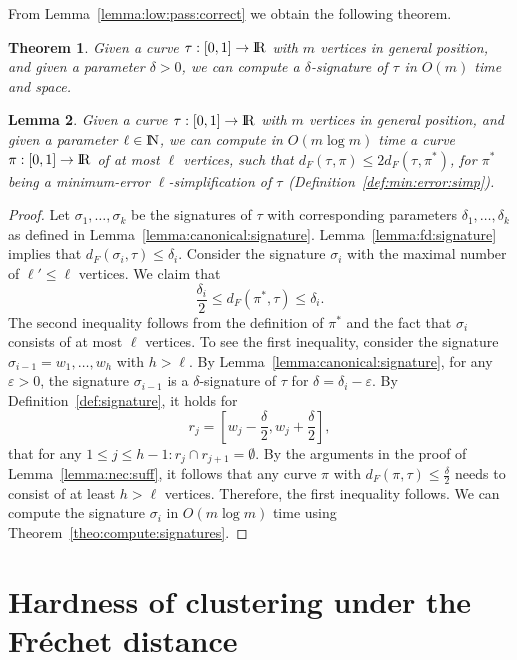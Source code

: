 \documentclass[11pt, letter]{article}
\newtheorem{theorem}{Theorem}[section]
\newtheorem{lemma}[theorem]{Lemma}
\newcommand{\seclab}[1]{\label{sec:#1}}
\newcommand{\thmlab}[1]{{\label{theo:#1}}}
\newcommand{\thmref}[1]{Theorem~\ref{theo:#1}}
\newcommand{\lemlab}[1]{\label{lemma:#1}}
\newcommand{\lemref}[1]{Lemma~\ref{lemma:#1}}
\newcommand{\defref}[1]{Definition~\ref{def:#1}}
\newcommand{\Frechet}{Fr\'echet\xspace}
\providecommand{\eps}{{\varepsilon}}\newcommand{\Astop}{\overline{a}}
\providecommand{\pth}[2][\!]{#1\left({#2}\right)}
\renewcommand{\Re}{{\rm I\!\hspace{-0.025em} R}}
\newcommand{\Na}{{\rm I\!\hspace{-0.025em} N}}
\newcommand{\trajectory}[2]{\ensuremath{{#1}_{#2}}}
\newcommand{\inputSym}{\ensuremath{\tau}}
\newcommand{\inputTraj}[1]{\trajectory{\inputSym}{#1}}
\newcommand{\distFr}[2]{\ensuremath{d_F\pth{#1,#2}}}
\begin{document}
From \lemref{low:pass:correct} we obtain the following theorem.

\begin{theorem}\thmlab{computing:delta:signature}
Given a curve $\tau:[0,1]\rightarrow\Re$ with $m$ vertices 
in general position, and given a parameter $\delta>0$, we can compute a $\delta$-signature of $\inputTraj{}$ in $O(m)$ time and space.
\end{theorem}



\begin{lemma}\lemlab{apx:min:error:simp}
Given a curve $\tau:[0,1]\rightarrow\Re$ with $m$ vertices 
in general position, and given a parameter $\ell \in \Na$, we can compute in $O(m \log m)$ time a curve $\pi:[0,1]\rightarrow\Re$ of at most $\ell$ vertices, such that $\distFr{\inputTraj{}}{\pi} \leq 2 \distFr{\inputTraj{}}{\pi^*}$, for $\pi^*$ being a minimum-error $\ell$-simplification of $\inputTraj{}$ (\defref{min:error:simp}). 
\end{lemma}

\begin{proof}
Let $\sigma_1,\dots,\sigma_k$ be the signatures of $\tau$ with corresponding parameters $\delta_1,\dots,\delta_k$ as defined in \lemref{canonical:signature}. \lemref{fd:signature} implies that $\distFr{\sigma_i}{\tau} \leq \delta_i$. Consider the signature $\sigma_i$ with the maximal number of $\ell'\leq \ell$ vertices. We claim that 
\[ \frac{\delta_i}{2}\leq \distFr{\pi^{*}}{\tau} \leq \delta_i .\]
The second inequality follows from the definition of $\pi^{*}$ and the fact that $\sigma_i$ consists of at most $\ell$ vertices. To see the first inequality, consider the signature $\sigma_{i-1}=w_1,\dots,w_{h}$ with $h>\ell$. By \lemref{canonical:signature}, for any $\eps>0$, the signature $\sigma_{i-1}$ is a $\delta$-signature of $\tau$ for $\delta=\delta_i-\eps$. By \defref{signature}, it holds for
\[r_j = \left[w_j-\frac{\delta}{2}, w_j+\frac{\delta}{2}\right],\]
that for any $1\leq j \leq h-1: r_j \cap r_{j+1} = \emptyset.$ By the arguments in the proof of \lemref{nec:suff}, it follows that any curve $\pi$ with $\distFr{\pi}{\tau}\leq \frac{\delta}{2}$ needs to consist of at least $h>\ell$ vertices. Therefore, the first inequality follows. We can compute the signature $\sigma_i$ in $O(m \log m)$ time using \thmref{compute:signatures}.
\end{proof}






\section{Hardness of clustering under the \Frechet distance}
\seclab{nphard}
\end{document}
